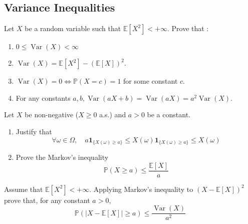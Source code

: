 \begin{center}
  \section*{Variance Inequalities}
\end{center}

\begin{Exercise}
  Let $X$ be a random variable such that $\mathbb{E}\left[X^2\right]<+\infty$. Prove that :
  \begin{enumerate}
    \item $0 \leq \operatorname{Var}(X)<\infty$
    \item $\operatorname{Var}(X)=\mathbb{E}\left[X^2\right]-(\mathbb{E}[X])^2$.
    \item $\operatorname{Var}(X)=0 \Longleftrightarrow \mathbb{P}(X=c)=1$ for some constant $c$.
    \item For any constants $a, b, \operatorname{Var}(a X+b)=\operatorname{Var}(a X)=a^2 \operatorname{Var}(X)$.
  \end{enumerate}
\end{Exercise}

\begin{Exercise}
  Let $X$ be non-negative ($X \geq 0$ a.s.) and $a>0$ be a constant.
  \begin{enumerate}
    \item Justify that
          $$\forall \omega \in \Omega, \quad a \mathbf{1}_{\{X(\omega) \geqslant a\}} \leqslant X(\omega) \mathbf{1}_{\{X(\omega) \geqslant a\}} \leqslant X(\omega)$$
    \item Prove the Markov's inequality
          $$
            \mathbb{P}(X \geq a) \leq \frac{\mathbb{E}[X]}{a}
          $$
  \end{enumerate}
\end{Exercise}

\begin{Exercise}
  Assume that $\mathbb{E}\left[X^2\right]<+\infty$. Applying Markov's inequality to $(X-\mathbb{E}[X])^2$ prove that, for any constant $a>0$,
  $$
    \mathbb{P}(|X-\mathbb{E}[X]| \geq a) \leq \frac{\operatorname{Var}(X)}{a^2}
  $$
\end{Exercise}